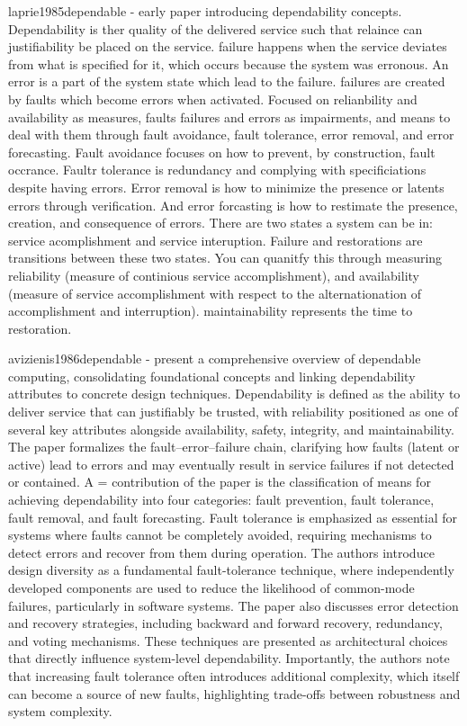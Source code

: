 laprie1985dependable - early paper introducing dependability concepts. Dependability is ther quality of the delivered service such that relaince can justifiability be placed on the service. failure happens when the service deviates from what is specified for it, which occurs because the system was erronous. An error is a part of the system state which lead to the failure. failures are created by faults which become errors when activated.  Focused on relianbility and availability as measures, faults failures and errors as impairments, and means to deal with them through fault avoidance, fault tolerance, error removal, and error forecasting. Fault avoidance focuses on how to prevent, by construction, fault occrance. Faultr tolerance is redundancy and complying with specificiations despite having errors. Error removal is how to minimize the presence or latents errors through verification. And error forcasting is how to restimate the presence, creation, and consequence of errors. There are two states a system can be in: service acomplishment and service interuption. Failure and restorations are transitions between these two states. You can quanitfy this through measuring reliability (measure of continious service accomplishment), and availability (measure of service accomplishment with respect to the alternationation of accomplishment and interruption). maintainability represents the time to restoration.

avizienis1986dependable - present a comprehensive overview of dependable computing, consolidating foundational concepts and linking dependability attributes to concrete design techniques. Dependability is defined as the ability to deliver service that can justifiably be trusted, with reliability positioned as one of several key attributes alongside availability, safety, integrity, and maintainability. The paper formalizes the fault–error–failure chain, clarifying how faults (latent or active) lead to errors and may eventually result in service failures if not detected or contained. A = contribution of the paper is the classification of means for achieving dependability into four categories: fault prevention, fault tolerance, fault removal, and fault forecasting. Fault tolerance is emphasized as essential for systems where faults cannot be completely avoided, requiring mechanisms to detect errors and recover from them during operation. The authors introduce design diversity as a fundamental fault-tolerance technique, where independently developed components are used to reduce the likelihood of common-mode failures, particularly in software systems. The paper also discusses error detection and recovery strategies, including backward and forward recovery, redundancy, and voting mechanisms. These techniques are presented as architectural choices that directly influence system-level dependability. Importantly, the authors note that increasing fault tolerance often introduces additional complexity, which itself can become a source of new faults, highlighting trade-offs between robustness and system complexity.


